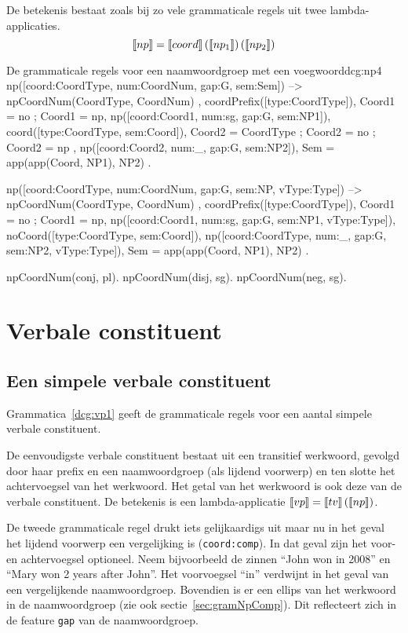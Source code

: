 De betekenis bestaat zoals bij zo vele grammaticale regels uit twee lambda-applicaties. $$\llbracket np\rrbracket = \llbracket coord\rrbracket \left( \llbracket np_1\rrbracket \right) \left( \llbracket np_2\rrbracket \right)$$

\begin{dcg}{De grammaticale regels voor een naamwoordgroep met een voegwoord}{dcg:np4}
np([coord:CoordType, num:CoordNum, gap:G, sem:Sem]) -->
  { npCoordNum(CoordType, CoordNum) },
  coordPrefix([type:CoordType]),
  { Coord1 = no ; Coord1 = np},
  np([coord:Coord1, num:sg, gap:G, sem:NP1]),
  coord([type:CoordType, sem:Coord]),
  { Coord2 = CoordType ; Coord2 = no ; Coord2 = np },
  np([coord:Coord2, num:_, gap:G, sem:NP2]),
  { Sem = app(app(Coord, NP1), NP2) }.

np([coord:CoordType, num:CoordNum, gap:G, sem:NP, vType:Type]) -->
  { npCoordNum(CoordType, CoordNum) },
  coordPrefix([type:CoordType]),
  { Coord1 = no ; Coord1 = np},
  np([coord:Coord1, num:sg, gap:G, sem:NP1, vType:Type]),
  noCoord([type:CoordType, sem:Coord]),
  np([coord:CoordType, num:_, gap:G, sem:NP2, vType:Type]),
  { Sem = app(app(Coord, NP1), NP2) }.

npCoordNum(conj, pl).
npCoordNum(disj, sg).
npCoordNum(neg, sg).
\end{dcg}

\section{Verbale constituent}
\subsection{Een simpele verbale constituent}
Grammatica~\ref{dcg:vp1} geeft de grammaticale regels voor een aantal simpele verbale constituent.

De eenvoudigste verbale constituent bestaat uit een transitief werkwoord, gevolgd door haar prefix en een naamwoordgroep (als lijdend voorwerp) en ten slotte het achtervoegsel van het werkwoord. Het getal van het werkwoord is ook deze van de verbale constituent. De betekenis is een lambda-applicatie $\llbracket vp\rrbracket = \llbracket tv\rrbracket \left( {\llbracket np\rrbracket} \right)$.

De tweede grammaticale regel drukt iets gelijkaardigs uit maar nu in het geval het lijdend voorwerp een vergelijking is (\texttt{coord:comp}). In dat geval zijn het voor- en achtervoegsel optioneel. Neem bijvoorbeeld de zinnen ``John won in 2008'' en ``Mary won 2 years after John''. Het voorvoegsel ``in'' verdwijnt in het geval van een vergelijkende naamwoordgroep. Bovendien is er een ellips van het werkwoord in de naamwoordgroep (zie ook sectie~\ref{sec:gramNpComp}). Dit reflecteert zich in de feature \texttt{gap} van de naamwoordgroep. 


